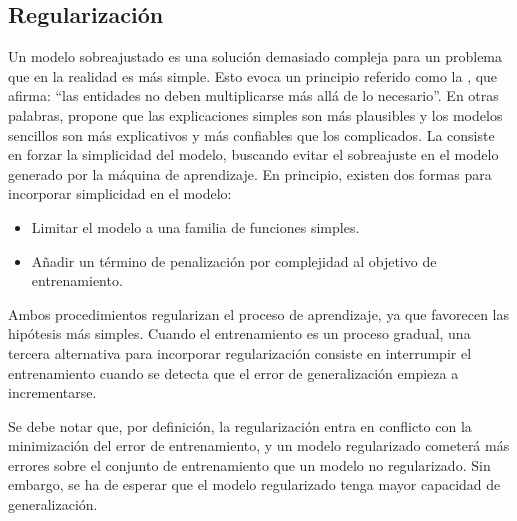 %
%
\subsection{Regularización}
%
Un modelo sobreajustado es una solución demasiado compleja para un
problema que en la realidad es más simple.
Esto evoca un principio referido como la , que
afirma: ``las entidades no deben multiplicarse más allá
de lo necesario''.
En otras palabras, propone que las explicaciones simples son más
plausibles y los modelos sencillos son más explicativos y más
confiables que los complicados.
La  consiste en forzar la simplicidad del modelo,
buscando evitar el sobreajuste en el modelo generado por la máquina
de aprendizaje.
En principio, existen dos formas para incorporar simplicidad en el
modelo:
%
\begin{itemize}
\item Limitar el modelo a una familia de funciones simples.
\item Añadir un término de penalización por complejidad al objetivo
  de entrenamiento.
\end{itemize}
%
Ambos procedimientos regularizan el proceso de aprendizaje, ya
que favorecen las hipótesis más simples.
Cuando el entrenamiento es un proceso gradual, una tercera
alternativa para incorporar regularización consiste en
interrumpir el entrenamiento cuando se detecta
que el error de generalización empieza a incrementarse.

Se debe notar que, por definición, la regularización entra en conflicto con
la minimización del error de entrenamiento, y un modelo regularizado
cometerá más errores sobre el conjunto de entrenamiento que un modelo
no regularizado.
Sin embargo, se ha de esperar que el modelo
regularizado tenga mayor capacidad de generalización.

